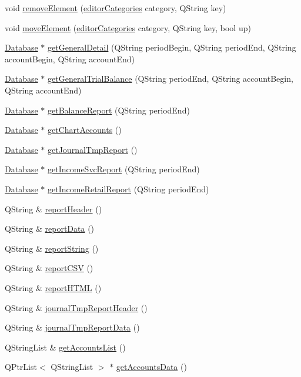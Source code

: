 \begin{CompactItemize}
\item 
void \hyperlink{classDatabase_a20}{remove\-Element} (\hyperlink{classDatabase_w8}{editor\-Categories} category, QString key)
\item 
void \hyperlink{classDatabase_a21}{move\-Element} (\hyperlink{classDatabase_w8}{editor\-Categories} category, QString key, bool up)
\item 
\hyperlink{classDatabase}{Database} $\ast$ \hyperlink{classDatabase_a22}{get\-General\-Detail} (QString period\-Begin, QString period\-End, QString account\-Begin, QString account\-End)
\item 
\hyperlink{classDatabase}{Database} $\ast$ \hyperlink{classDatabase_a23}{get\-General\-Trial\-Balance} (QString period\-End, QString account\-Begin, QString account\-End)
\item 
\hyperlink{classDatabase}{Database} $\ast$ \hyperlink{classDatabase_a24}{get\-Balance\-Report} (QString period\-End)
\item 
\hyperlink{classDatabase}{Database} $\ast$ \hyperlink{classDatabase_a25}{get\-Chart\-Accounts} ()
\item 
\hyperlink{classDatabase}{Database} $\ast$ \hyperlink{classDatabase_a26}{get\-Journal\-Tmp\-Report} ()
\item 
\hyperlink{classDatabase}{Database} $\ast$ \hyperlink{classDatabase_a27}{get\-Income\-Svc\-Report} (QString period\-End)
\item 
\hyperlink{classDatabase}{Database} $\ast$ \hyperlink{classDatabase_a28}{get\-Income\-Retail\-Report} (QString period\-End)
\item 
QString \& \hyperlink{classDatabase_a29}{report\-Header} ()
\item 
QString \& \hyperlink{classDatabase_a30}{report\-Data} ()
\item 
QString \& \hyperlink{classDatabase_a31}{report\-String} ()
\item 
QString \& \hyperlink{classDatabase_a32}{report\-CSV} ()
\item 
QString \& \hyperlink{classDatabase_a33}{report\-HTML} ()
\item 
QString \& \hyperlink{classDatabase_a34}{journal\-Tmp\-Report\-Header} ()
\item 
QString \& \hyperlink{classDatabase_a35}{journal\-Tmp\-Report\-Data} ()
\item 
QString\-List \& \hyperlink{classDatabase_a36}{get\-Accounts\-List} ()
\item 
QPtr\-List$<$ QString\-List $>$ $\ast$ \hyperlink{classDatabase_a37}{get\-Accounts\-Data} ()

\end{CompactItemize}
